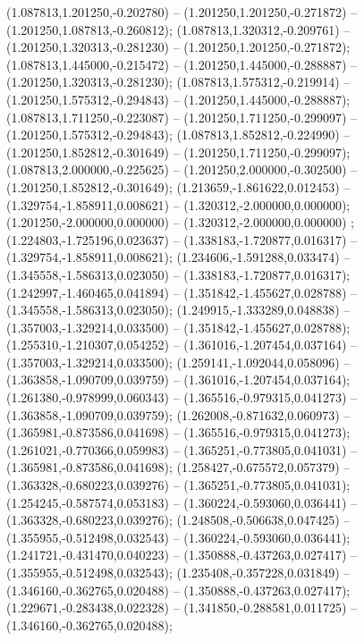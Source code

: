  (1.087813,1.201250,-0.202780) -- (1.201250,1.201250,-0.271872) -- (1.201250,1.087813,-0.260812);
 (1.087813,1.320312,-0.209761) -- (1.201250,1.320313,-0.281230) -- (1.201250,1.201250,-0.271872);
 (1.087813,1.445000,-0.215472) -- (1.201250,1.445000,-0.288887) -- (1.201250,1.320313,-0.281230);
 (1.087813,1.575312,-0.219914) -- (1.201250,1.575312,-0.294843) -- (1.201250,1.445000,-0.288887);
 (1.087813,1.711250,-0.223087) -- (1.201250,1.711250,-0.299097) -- (1.201250,1.575312,-0.294843);
 (1.087813,1.852812,-0.224990) -- (1.201250,1.852812,-0.301649) -- (1.201250,1.711250,-0.299097);
 (1.087813,2.000000,-0.225625) -- (1.201250,2.000000,-0.302500) -- (1.201250,1.852812,-0.301649);
 (1.213659,-1.861622,0.012453) -- (1.329754,-1.858911,0.008621) -- (1.320312,-2.000000,0.000000);
 (1.201250,-2.000000,0.000000) -- (1.320312,-2.000000,0.000000) ;
 (1.224803,-1.725196,0.023637) -- (1.338183,-1.720877,0.016317) -- (1.329754,-1.858911,0.008621);
 (1.234606,-1.591288,0.033474) -- (1.345558,-1.586313,0.023050) -- (1.338183,-1.720877,0.016317);
 (1.242997,-1.460465,0.041894) -- (1.351842,-1.455627,0.028788) -- (1.345558,-1.586313,0.023050);
 (1.249915,-1.333289,0.048838) -- (1.357003,-1.329214,0.033500) -- (1.351842,-1.455627,0.028788);
 (1.255310,-1.210307,0.054252) -- (1.361016,-1.207454,0.037164) -- (1.357003,-1.329214,0.033500);
 (1.259141,-1.092044,0.058096) -- (1.363858,-1.090709,0.039759) -- (1.361016,-1.207454,0.037164);
 (1.261380,-0.978999,0.060343) -- (1.365516,-0.979315,0.041273) -- (1.363858,-1.090709,0.039759);
 (1.262008,-0.871632,0.060973) -- (1.365981,-0.873586,0.041698) -- (1.365516,-0.979315,0.041273);
 (1.261021,-0.770366,0.059983) -- (1.365251,-0.773805,0.041031) -- (1.365981,-0.873586,0.041698);
 (1.258427,-0.675572,0.057379) -- (1.363328,-0.680223,0.039276) -- (1.365251,-0.773805,0.041031);
 (1.254245,-0.587574,0.053183) -- (1.360224,-0.593060,0.036441) -- (1.363328,-0.680223,0.039276);
 (1.248508,-0.506638,0.047425) -- (1.355955,-0.512498,0.032543) -- (1.360224,-0.593060,0.036441);
 (1.241721,-0.431470,0.040223) -- (1.350888,-0.437263,0.027417) -- (1.355955,-0.512498,0.032543);
 (1.235408,-0.357228,0.031849) -- (1.346160,-0.362765,0.020488) -- (1.350888,-0.437263,0.027417);
 (1.229671,-0.283438,0.022328) -- (1.341850,-0.288581,0.011725) -- (1.346160,-0.362765,0.020488);
